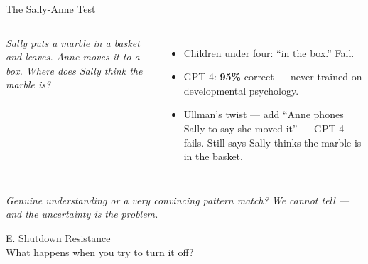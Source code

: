 \documentclass[aspectratio=169, 12pt, xcolor={dvipsnames,table}]{beamer}
\begin{document}
\begin{frame}{The Sally-Anne Test}
  \begin{columns}[T]
    {\small\textit{Sally puts a marble in a basket and leaves.
    Anne moves it to a box. Where does Sally think the marble is?}}
    \vspace{0.6em}

    \begin{itemize}\setlength{\itemsep}{0.2em}
      \item {\small Children under four: ``in the box.'' \color{alertRed}Fail.}
      \item {\small GPT-4: \textbf{95\%} correct --- never trained on
            developmental psychology.}
      \item {\small Ullman's twist --- add ``Anne phones Sally to
            say she moved it'' --- \alert{GPT-4 fails}. Still says
            Sally thinks the marble is in the basket.}
    \end{itemize}

  \end{columns}
  \vspace{0.3em}
  {\footnotesize\itshape Genuine understanding or a very convincing
  pattern match? We cannot tell --- and the uncertainty is the problem.}
\end{frame}



\begin{frame}[standout]
  \Large E.\; Shutdown Resistance\\[6pt]
  \normalsize What happens when you try to turn it off?
\end{frame}
\end{document}
